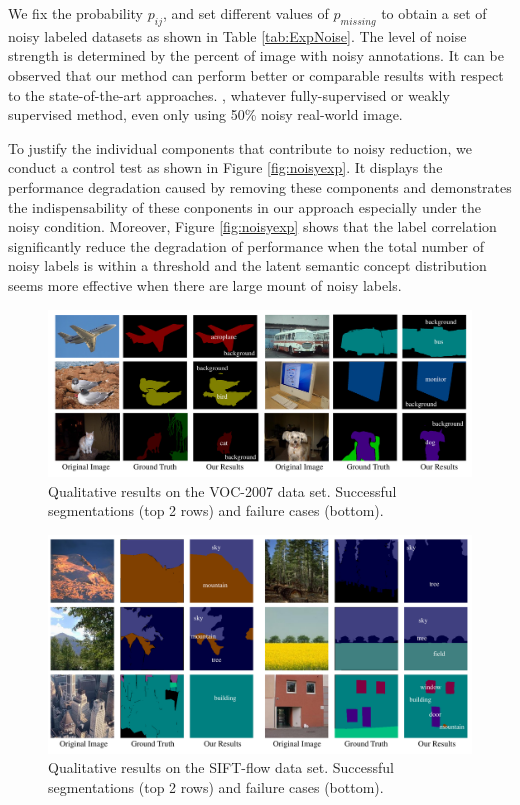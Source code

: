 We fix the probability $p_{ij}$, and set different values of $p_{missing}$ to obtain a set of noisy labeled datasets as shown in Table \ref{tab:ExpNoise}. The level of noise strength is determined by the percent of image with noisy annotations. It can be observed that our method can perform better or comparable results with respect to the state-of-the-art approaches.
\if
, whatever fully-supervised or weakly supervised method, even only using 50\% noisy real-world image.
\fi

To justify the individual components that contribute to noisy reduction, we conduct a control test as shown in Figure \ref{fig:noisyexp}. It displays the performance degradation caused by removing these components and demonstrates the indispensability of these conponents in our approach especially under the noisy condition. Moreover, Figure \ref{fig:noisyexp} shows that the label correlation significantly reduce the degradation of performance when the total number of noisy labels is within a threshold and the latent semantic concept distribution seems more effective when there are large mount of noisy labels.

\begin{figure}
\begin{center}
    \includegraphics[width=0.9\linewidth]{Fig_VOC.pdf}
\end{center}
\vspace{-3mm}
\caption{Qualitative results on the VOC-2007 data set. Successful segmentations (top 2 rows) and failure cases (bottom).}
\label{fig:VOC-2007}
\end{figure}

\begin{figure}
\begin{center}
    \includegraphics[width=0.9\linewidth]{Fig_SIFTflow.pdf}
\end{center}
\vspace{-3mm}
\caption{Qualitative results on the SIFT-flow data set. Successful segmentations (top 2 rows) and failure cases (bottom).}
\label{fig:SIFT-flow}
\end{figure}


